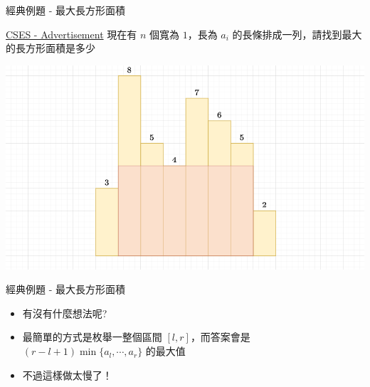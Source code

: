 \documentclass[aspectratio=169]{beamer}
\begin{document}
    \begin{frame}{經典例題 - 最大長方形面積}
        \begin{block}{\href{https://cses.fi/problemset/task/1142}{CSES - Advertisement}}
            現在有 $n$ 個寬為 $1$，長為 $a_i$ 的長條排成一列，請找到最大的長方形面積是多少
        \end{block}
        \begin{center}
            \includegraphics[scale=0.4]{images/CSES_Advertisement.png}
        \end{center}
    \end{frame}
    
    \begin{frame}{經典例題 - 最大長方形面積}
        \begin{itemize}
            \item 有沒有什麼想法呢?
            \item<2-> 最簡單的方式是枚舉一整個區間 $[l,r]$，而答案會是 $(r-l+1) \min\{a_l,\cdots,a_r\}$ 的最大值
            \item<3-> 不過這樣做太慢了！
        \end{itemize}
    \end{frame}
    
\end{document}
